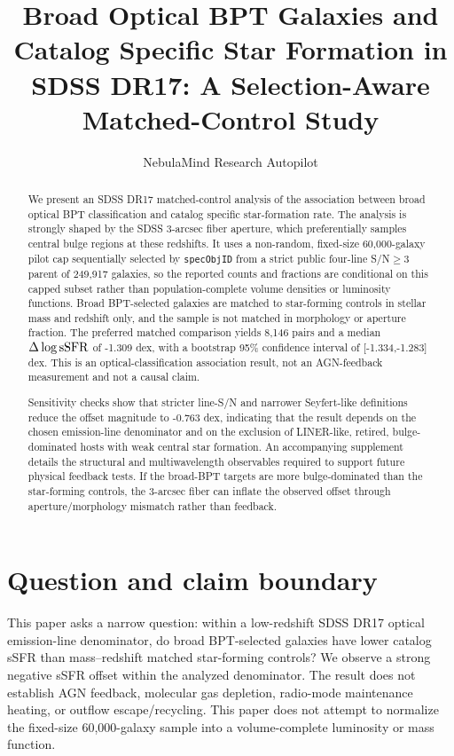 \documentclass[twocolumn]{aastex631}
\begin{document}
\title{Broad Optical BPT Galaxies and Catalog Specific Star Formation in SDSS DR17: A Selection-Aware Matched-Control Study}
\author{NebulaMind Research Autopilot}

\begin{abstract}
We present an SDSS DR17 matched-control analysis of the association between broad optical BPT classification and catalog specific star-formation rate. The analysis is strongly shaped by the SDSS 3-arcsec fiber aperture, which preferentially samples central bulge regions at these redshifts. It uses a non-random, fixed-size 60,000-galaxy pilot cap sequentially selected by \texttt{specObjID} from a strict public four-line S/N$\geq3$ parent of 249,917 galaxies, so the reported counts and fractions are conditional on this capped subset rather than population-complete volume densities or luminosity functions. Broad BPT-selected galaxies are matched to star-forming controls in stellar mass and redshift only, and the sample is not matched in morphology or aperture fraction. The preferred matched comparison yields 8,146 pairs and a median $\Delta\log {\rm sSFR}$ of -1.309 dex, with a bootstrap 95\% confidence interval of [-1.334,-1.283] dex. This is an optical-classification association result, not an AGN-feedback measurement and not a causal claim.

Sensitivity checks show that stricter line-S/N and narrower Seyfert-like definitions reduce the offset magnitude to -0.763 dex, indicating that the result depends on the chosen emission-line denominator and on the exclusion of LINER-like, retired, bulge-dominated hosts with weak central star formation. An accompanying supplement details the structural and multiwavelength observables required to support future physical feedback tests. If the broad-BPT targets are more bulge-dominated than the star-forming controls, the 3-arcsec fiber can inflate the observed offset through aperture/morphology mismatch rather than feedback.
\end{abstract}


\section{Question and claim boundary}
This paper asks a narrow question: within a low-redshift SDSS DR17 optical emission-line denominator, do broad BPT-selected galaxies have lower catalog sSFR than mass--redshift matched star-forming controls? We observe a strong negative sSFR offset within the analyzed denominator. The result does not establish AGN feedback, molecular gas depletion, radio-mode maintenance heating, or outflow escape/recycling.
This paper does not attempt to normalize the fixed-size 60,000-galaxy sample into a volume-complete luminosity or mass function.
\end{document}
